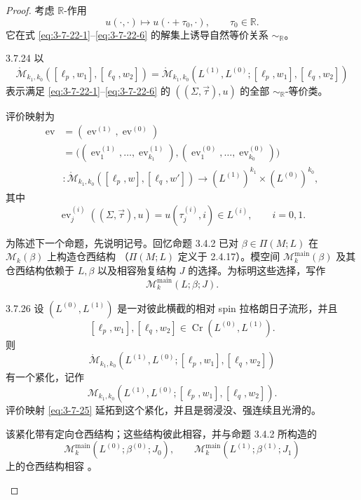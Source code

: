 \begin{proof}
考虑 $\mathbb R$-作用
\[
 u(\mathord\cdot,\mathord\cdot)
 \longmapsto u(\mathord\cdot+\tau_0,\mathord\cdot),
 \qquad \tau_0\in\mathbb R.
\]
它在式 \eqref{eq:3-7-22-1}--\eqref{eq:3-7-22-6} 的解集上诱导自然等价关系
$\sim_{\mathbb R}$。

\begin{definition}{3.7.24}\label{def:3-7-24}
以
\[
 \mathring{\mathcal M}_{k_1,k_0}([\ell_p,w_1],[\ell_q,w_2])
 =
 \mathring{\mathcal M}_{k_1,k_0}
 (L^{(1)},L^{(0)};[\ell_p,w_1],[\ell_q,w_2])
\]
表示满足 \eqref{eq:3-7-22-1}--\eqref{eq:3-7-22-6} 的
$((\Sigma,\vec\tau),u)$ 的全部 $\sim_{\mathbb R}$-等价类。
\end{definition}

评价映射为
\begin{equation}
\begin{aligned}
 \operatorname{ev}
 &=(\operatorname{ev}^{(1)},\operatorname{ev}^{(0)})\\
 &=\bigl((\operatorname{ev}^{(1)}_1,\ldots,
   \operatorname{ev}^{(1)}_{k_1}),
   (\operatorname{ev}^{(0)}_1,\ldots,
   \operatorname{ev}^{(0)}_{k_0})\bigr)\\
 &\colon
 \mathring{\mathcal M}_{k_1,k_0}([\ell_p,w],[\ell_q,w'])
 \longrightarrow (L^{(1)})^{k_1}\times(L^{(0)})^{k_0},
\end{aligned}
\tag{3.7.25}\label{eq:3-7-25}
\end{equation}
其中
\[
 \operatorname{ev}^{(i)}_j((\Sigma,\vec\tau),u)
 =u(\tau_j^{(i)},i)\in L^{(i)},\qquad i=0,1.
\]

为陈述下一个命题，先说明记号。回忆命题 3.4.2 已对
$\beta\in\Pi(M;L)$ 在 $\mathcal M_k(\beta)$ 上构造仓西结构
（$\Pi(M;L)$ 定义于 2.4.17）。模空间
$\mathcal M_k^{\mathrm{main}}(\beta)$ 及其仓西结构依赖于 $L,\beta$
以及相容殆复结构 $J$ 的选择。为标明这些选择，写作
\[
 \mathcal M_k^{\mathrm{main}}(L;\beta;J).
\]

\begin{proposition}{3.7.26}\label{prop:3-7-26}
设 $(L^{(0)},L^{(1)})$ 是一对彼此横截的相对 spin 拉格朗日子流形，并且
\[
 [\ell_p,w_1],[\ell_q,w_2]
 \in\operatorname{Cr}(L^{(0)},L^{(1)}).
\]
则
\[
 \mathring{\mathcal M}_{k_1,k_0}
 (L^{(1)},L^{(0)};[\ell_p,w_1],[\ell_q,w_2])
\]
有一个紧化，记作
\[
 \mathcal M_{k_1,k_0}
 (L^{(1)},L^{(0)};[\ell_p,w_1],[\ell_q,w_2]).
\]
评价映射 \eqref{eq:3-7-25} 延拓到这个紧化，并且是弱浸没、强连续且光滑的。

该紧化带有定向仓西结构；这些结构彼此相容，并与命题 3.4.2 所构造的
\[
 \mathcal M_k^{\mathrm{main}}(L^{(0)};\beta^{(0)};J_0),
 \qquad
\mathcal M_k^{\mathrm{main}}(L^{(1)};\beta^{(1)};J_1)
\]
上的仓西结构相容
。
\end{proposition}


\end{proof}
